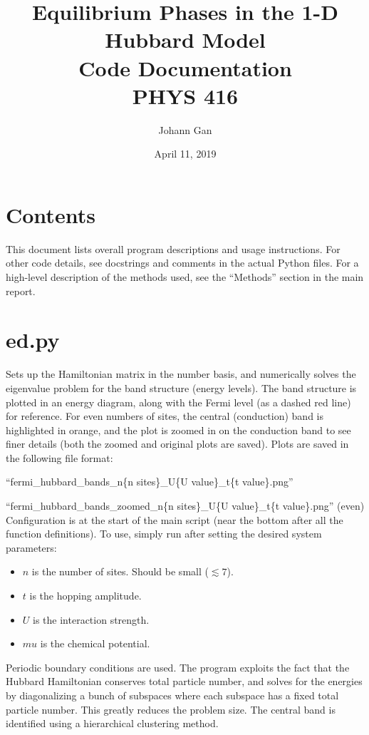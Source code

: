 \documentclass{article}
\title{%
	Equilibrium Phases in the 1-D Hubbard Model \\
	Code Documentation \\
	\large PHYS 416}
\author{Johann Gan}
\date{April 11, 2019}
\newcommand{\p}{\newline\newline}		%
\begin{document}
\maketitle

\section{Contents} This document lists overall program descriptions and usage instructions. For other code details, see docstrings and comments in the actual Python files. For a high-level description of the methods used, see the ``Methods'' section in the main report.

\section{ed.py}
Sets up the Hamiltonian matrix in the number basis, and numerically solves the eigenvalue problem for the band structure (energy levels). The band structure is plotted in an energy diagram, along with the Fermi level (as a dashed red line) for reference. For even numbers of sites, the central (conduction) band is highlighted in orange, and the plot is zoomed in on the conduction band to see finer details (both the zoomed and original plots are saved).
\p
Plots are saved in the following file format:

``fermi\_hubbard\_bands\_n\{n sites\}\_U\{U value\}\_t\{t value\}.png''

``fermi\_hubbard\_bands\_zoomed\_n\{n sites\}\_U\{U value\}\_t\{t value\}.png'' (even)
\p
Configuration is at the start of the main script (near the bottom after all the function definitions). To use, simply run after setting the desired system parameters:
\begin{itemize}
\item $n$ is the number of sites. Should be small ($\lesssim 7$).
\item $t$ is the hopping amplitude.
\item $U$ is the interaction strength.
\item $mu$ is the chemical potential.
\end{itemize}
Periodic boundary conditions are used. The program exploits the fact that the Hubbard Hamiltonian conserves total particle number, and solves for the energies by diagonalizing a bunch of subspaces where each subspace has a fixed total particle number. This greatly reduces the problem size. The central band is identified using a hierarchical clustering method.
\end{document}
